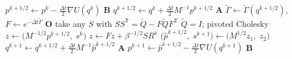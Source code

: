 \documentclass[border=10pt]{standalone}
\newcommand{\step}[1]{\textcolor{accent}{\textbf{#1}}}
\newcommand{\note}[1]{\textcolor{muted}{\small #1}}
\begin{document}
\pagecolor{bg}
\begin{minipage}{15.4cm}
\color{ink}
\begin{algorithm}[H]
\caption{one step of the quasi-Markovian GLE}
\KwInit{$s^0 \sim \mathcal{N}(0, \beta^{-1} I_m)$
        \hfill\note{stationary random force}}
\BlankLine
$p^{k+1/2} \leftarrow p^k - \tfrac{\Delta t}{2}\nabla U(q^k)$ \hfill\step{B}\;
$q^{k+1/2} \leftarrow q^k + \tfrac{\Delta t}{2} M^{-1} p^{k+1/2}$ \hfill\step{A}\;
\BlankLine
$\widetilde{\Gamma} \leftarrow \widetilde{\Gamma}(q^{k+1/2})$,\quad
$F \leftarrow e^{-\Delta t \widetilde{\Gamma}}$ \hfill\step{O}\;
\quad take any $S$ with $S S^{\mathsf{T}} = \widetilde{Q} - F \widetilde{Q} F^{\mathsf{T}}$
      \hfill\note{$\widetilde{Q} = I$; pivoted Cholesky}\;
\quad $z \leftarrow \bigl(M^{-1/2} p^{k+1/2},\; s^k\bigr)$\;
\quad $z \leftarrow F z + \beta^{-1/2} S R^k$\;
\quad $\bigl(\hat{p}^{k+1/2},\; s^{k+1}\bigr) \leftarrow \bigl(M^{1/2} z_1,\; z_2\bigr)$\;
\BlankLine
$q^{k+1} \leftarrow q^{k+1/2} + \tfrac{\Delta t}{2} M^{-1} \hat{p}^{k+1/2}$ \hfill\step{A}\;
$p^{k+1} \leftarrow \hat{p}^{k+1/2} - \tfrac{\Delta t}{2}\nabla U(q^{k+1})$ \hfill\step{B}\;
\end{algorithm}
\end{minipage}
\end{document}

